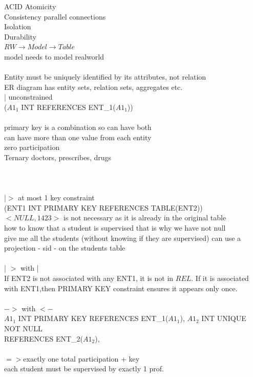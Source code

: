 \documentclass[11pt]{article}
\begin{document}
\noindent
ACID 
Atomicity\\
Consistency \implies parallel connections\\
Isolation\\
Durability\\
$RW \rightarrow Model \rightarrow  Table$\\
model needs to model realworld\\
\\
Entity must be uniquely identified by its attributes, not relation
\\
ER diagram has entity sets, relation sets, aggregates etc.\\
| unconstrained \\($A1_1$ INT REFERENCES ENT_1($A1_1$))\\
\\
primary key is a combination so can have both\\
can have more than one value from each entity\\
zero participation
\\
Ternary {doctors, prescribes, drugs}
\\
\\\\\\
|$>$ at most 1 key constraint \\(ENT1 INT PRIMARY KEY REFERENCES TABLE(ENT2))\\
$<NULL, 1423>$ is not necessary as it is already in the original table
\\
how to know that a student is supervised that is why we have not null\\
give me all the students (without knowing if they are supervised) can use a projection - sid - on the students table
\\\\
| $>$ with |\\
If ENT2 is not associated with any ENT1, it is not in $𝑅𝐸𝐿$. If it is associated with ENT1,then PRIMARY KEY constraint ensures it appears only once.\\
\\
$-> $ with $<-$\\
$A1_1$ INT PRIMARY KEY REFERENCES ENT_1($A1_1$), $A1_2$ INT UNIQUE NOT NULL \\REFERENCES ENT_2($A1_2$),\\\\
$=> $exactly one total participation + key\\
 each student must be supervised by exactly 1 prof.
 \\
\end{document}
